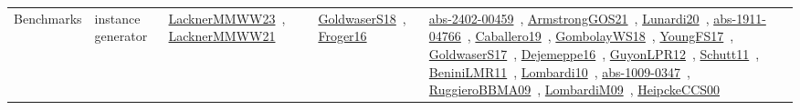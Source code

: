 {\begin{longtable}{lp{3cm}>{\raggedright\arraybackslash}p{6cm}>{\raggedright\arraybackslash}p{6cm}>{\raggedright\arraybackslash}p{8cm}}
Benchmarks & instance generator & \href{../works/LacknerMMWW23.pdf}{LacknerMMWW23}~\cite{LacknerMMWW23}, \href{../works/LacknerMMWW21.pdf}{LacknerMMWW21}~\cite{LacknerMMWW21} & \href{../works/GoldwaserS18.pdf}{GoldwaserS18}~\cite{GoldwaserS18}, \href{../works/Froger16.pdf}{Froger16}~\cite{Froger16} & \href{../works/abs-2402-00459.pdf}{abs-2402-00459}~\cite{abs-2402-00459}, \href{../works/ArmstrongGOS21.pdf}{ArmstrongGOS21}~\cite{ArmstrongGOS21}, \href{../works/Lunardi20.pdf}{Lunardi20}~\cite{Lunardi20}, \href{../works/abs-1911-04766.pdf}{abs-1911-04766}~\cite{abs-1911-04766}, \href{../works/Caballero19.pdf}{Caballero19}~\cite{Caballero19}, \href{../works/GombolayWS18.pdf}{GombolayWS18}~\cite{GombolayWS18}, \href{../works/YoungFS17.pdf}{YoungFS17}~\cite{YoungFS17}, \href{../works/GoldwaserS17.pdf}{GoldwaserS17}~\cite{GoldwaserS17}, \href{../works/Dejemeppe16.pdf}{Dejemeppe16}~\cite{Dejemeppe16}, \href{../works/GuyonLPR12.pdf}{GuyonLPR12}~\cite{GuyonLPR12}, \href{../works/Schutt11.pdf}{Schutt11}~\cite{Schutt11}, \href{../works/BeniniLMR11.pdf}{BeniniLMR11}~\cite{BeniniLMR11}, \href{../works/Lombardi10.pdf}{Lombardi10}~\cite{Lombardi10}, \href{../works/abs-1009-0347.pdf}{abs-1009-0347}~\cite{abs-1009-0347}, \href{../works/RuggieroBBMA09.pdf}{RuggieroBBMA09}~\cite{RuggieroBBMA09}, \href{../works/LombardiM09.pdf}{LombardiM09}~\cite{LombardiM09}, \href{../works/HeipckeCCS00.pdf}{HeipckeCCS00}~\cite{HeipckeCCS00}\\

\end{longtable}}
